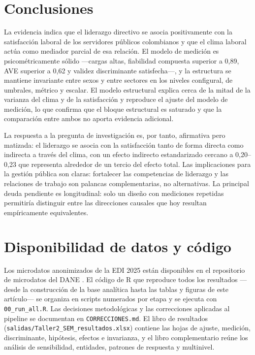 \documentclass[11pt,a4paper]{article}
\begin{document}
\section{Conclusiones}\label{sec:conclusiones}

La evidencia indica que el liderazgo directivo se asocia positivamente con la satisfacción
laboral de los servidores públicos colombianos y que el clima laboral actúa como mediador
parcial de esa relación. El modelo de medición es psicométricamente sólido —cargas altas,
fiabilidad compuesta superior a 0,89, AVE superior a 0,62 y validez discriminante
satisfecha—, y la estructura se mantiene invariante entre sexos y entre sectores en los
niveles configural, de umbrales, métrico y escalar. El modelo estructural explica cerca de la
mitad de la varianza del clima y de la satisfacción y reproduce el ajuste del modelo de
medición, lo que confirma que el bloque estructural es saturado y que la comparación entre
ambos no aporta evidencia adicional.

La respuesta a la pregunta de investigación es, por tanto, afirmativa pero matizada: el
liderazgo se asocia con la satisfacción tanto de forma directa como indirecta a través del
clima, con un efecto indirecto estandarizado cercano a 0,20--0,23 que representa alrededor de
un tercio del efecto total. Las implicaciones para la gestión pública son claras: fortalecer
las competencias de liderazgo y las relaciones de trabajo son palancas complementarias, no
alternativas. La principal deuda pendiente es longitudinal: solo un diseño con mediciones
repetidas permitiría distinguir entre las direcciones causales que hoy resultan
empíricamente equivalentes.

\section{Disponibilidad de datos y código}

Los microdatos anonimizados de la EDI 2025 están disponibles en el repositorio de microdatos
del DANE \citep{dane2025}. El código de R que reproduce todos los resultados —desde la
construcción de la base analítica hasta las tablas y figuras de este artículo— se organiza en
scripts numerados por etapa y se ejecuta con \texttt{00\_run\_all.R}. Las decisiones
metodológicas y las correcciones aplicadas al pipeline se documentan en
\texttt{CORRECCIONES.md}. El libro de resultados
(\texttt{salidas/Taller2\_SEM\_resultados.xlsx}) contiene las hojas de ajuste, medición,
discriminante, hipótesis, efectos e invarianza, y el libro complementario reúne los análisis
de sensibilidad, entidades, patrones de respuesta y multinivel.
\end{document}
